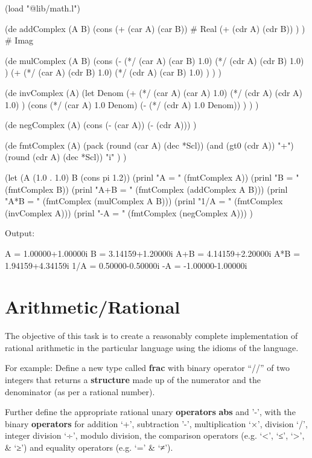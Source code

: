 \begin{wideverbatim}

(load "@lib/math.l")

(de addComplex (A B)
   (cons
      (+ (car A) (car B))        # Real
      (+ (cdr A) (cdr B)) ) )    # Imag

(de mulComplex (A B)
   (cons
      (-
         (*/ (car A) (car B) 1.0)
         (*/ (cdr A) (cdr B) 1.0) )
      (+
         (*/ (car A) (cdr B) 1.0)
         (*/ (cdr A) (car B) 1.0) ) ) )

(de invComplex (A)
   (let Denom
      (+
         (*/ (car A) (car A) 1.0)
         (*/ (cdr A) (cdr A) 1.0) )
      (cons
         (*/ (car A) 1.0 Denom)
         (- (*/ (cdr A) 1.0 Denom)) ) ) )

(de negComplex (A)
   (cons (- (car A)) (- (cdr A))) )

(de fmtComplex (A)
   (pack
      (round (car A) (dec *Scl))
      (and (gt0 (cdr A)) "+")
      (round (cdr A) (dec *Scl))
      "i" ) )

(let (A (1.0 . 1.0)  B (cons pi 1.2))
   (prinl "A = " (fmtComplex A))
   (prinl "B = " (fmtComplex B))
   (prinl "A+B = " (fmtComplex (addComplex A B)))
   (prinl "A*B = " (fmtComplex (mulComplex A B)))
   (prinl "1/A = " (fmtComplex (invComplex A)))
   (prinl "-A = " (fmtComplex (negComplex A))) )

Output:

A = 1.00000+1.00000i
B = 3.14159+1.20000i
A+B = 4.14159+2.20000i
A*B = 1.94159+4.34159i
1/A = 0.50000-0.50000i
-A = -1.00000-1.00000i

\end{wideverbatim}

\pagebreak{}
\section*{Arithmetic/Rational}

The objective of this task is to create a reasonably complete
implementation of rational arithmetic in the particular language using
the idioms of the language.

For example: Define a new type called \textbf{frac} with binary operator
``//'' of two integers that returns a \textbf{structure} made up of the
numerator and the denominator (as per a rational number).

Further define the appropriate rational unary \textbf{operators}
\textbf{abs} and '-', with the binary \textbf{operators} for addition
`+', subtraction '-', multiplication `×', division `/', integer division
`÷', modulo division, the comparison operators (e.g. `\textless{}', `≤',
`\textgreater{}', \& `≥') and equality operators (e.g. `=' \& `≠').

